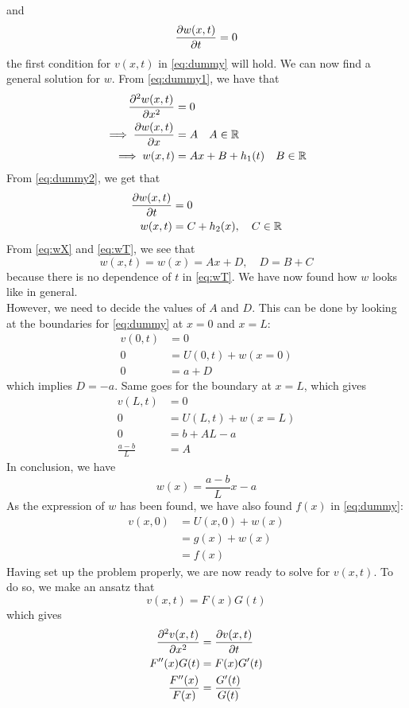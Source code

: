 \documentclass[12pt,english,a4paper]{article}
\begin{document}
and
\begin{equation} \label{eq:dummy2}
 \pdv{w(x,t)}{t} = 0
\end{equation}
the first condition for \(v(x,t)\) in \vref{eq:dummy} will hold. We can now find a general solution for \(w\). From \vref{eq:dummy1}, we have that
\begin{align}
	\pdv[2]{w(x,t)}{x}  &= 0 \nonumber \\
	\implies\pdv{w(x,t)}{x} &= A  \quad A \in \mathbb{R} \nonumber \\
	\implies w(x,t) &= Ax + B + h_1(t) \quad B \in \mathbb{R} \label{eq:wX}
\end{align}
From \vref{eq:dummy2}, we get that
\begin{align}
\pdv{w(x,t)}{t} &= 0 \nonumber \\
w(x,t) &= C + h_2(x) , \quad C \in \mathbb{R} \label{eq:wT}
\end{align}
From \vref{eq:wX} and \vref{eq:wT}, we see that
\[
w(x,t) = w(x) = Ax + D, \quad D=B+C
\]
because there is no dependence of \(t\) in \vref{eq:wT}.
We have now found how \(w\) looks like in general. \\
However, we need to decide the values of \(A\) and \(D\). This can be done by looking at the boundaries for \vref{eq:dummy} at \(x = 0 \) and \(x = L\):
\begin{align*}
v(0,t) &= 0 \\
0 &= U(0,t) + w(x=0) \\
0 &= a+D
\end{align*}
which implies \(D = -a\). Same goes for the boundary at \(x = L\), which gives
\begin{align*}
v(L,t) &= 0 \\
0 &= U(L,t) + w(x=L) \\
0 &= b+AL-a \\
\frac{a-b}{L} &= A
\end{align*}
In conclusion, we have
\[
w(x) = \frac{a-b}{L}x - a
\]
As the expression of \(w\) has been found, we have also found \(f(x)\) in \vref{eq:dummy}:
\begin{align*}
	v(x,0) &= U(x,0) + w(x) \\
	&= g(x)+w(x) \\
	&=f(x)
\end{align*}
Having set up the problem properly, we are now ready to solve for \(v(x,t)\). To do so, we make an ansatz that
\[
v(x,t) = F(x)G(t)
\]
which gives
\begin{align}
\pdv[2]{v(x,t)}{x} &= \pdv{v(x,t)}{t} \nonumber \\
F''(x)G(t) &= F(x)G'(t) \nonumber \\
\frac{F''(x)}{F(x)} &= \frac{G'(t)}{G(t)} \label{eq:ration}
\end{align}
\end{document}
